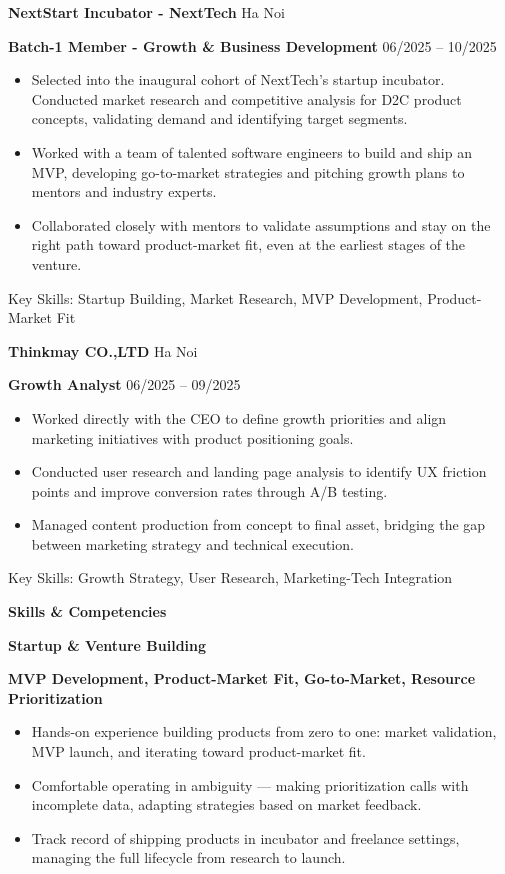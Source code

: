 \documentclass[11pt]{article}
\begin{document}
\vspace{12pt}

\textbf{NextStart Incubator - NextTech} \hfill Ha Noi

\textbf{Batch-1 Member - Growth \& Business Development} \hfill 06/2025 -- 10/2025
\begin{itemize}[noitemsep, topsep=0pt, partopsep=0pt, parsep=0pt]
    \item Selected into the inaugural cohort of NextTech's startup incubator. Conducted market research and competitive analysis for D2C product concepts, validating demand and identifying target segments.
    \item Worked with a team of talented software engineers to build and ship an MVP, developing go-to-market strategies and pitching growth plans to mentors and industry experts.
    \item Collaborated closely with mentors to validate assumptions and stay on the right path toward product-market fit, even at the earliest stages of the venture.
\end{itemize}
Key Skills: Startup Building, Market Research, MVP Development, Product-Market Fit

\vspace{12pt}

\textbf{Thinkmay CO.,LTD} \hfill Ha Noi

\textbf{Growth Analyst} \hfill 06/2025 -- 09/2025
\begin{itemize}[noitemsep, topsep=0pt, partopsep=0pt, parsep=0pt]
    \item Worked directly with the CEO to define growth priorities and align marketing initiatives with product positioning goals.
    \item Conducted user research and landing page analysis to identify UX friction points and improve conversion rates through A/B testing.
    \item Managed content production from concept to final asset, bridging the gap between marketing strategy and technical execution.
\end{itemize}
Key Skills: Growth Strategy, User Research, Marketing-Tech Integration

\newpage
\begin{center}
    \textbf{Skills \& Competencies}
\end{center}

\textbf{Startup \& Venture Building}

\textbf{MVP Development, Product-Market Fit, Go-to-Market, Resource Prioritization}
\begin{itemize}[noitemsep, topsep=0pt]
    \item Hands-on experience building products from zero to one: market validation, MVP launch, and iterating toward product-market fit.
    \item Comfortable operating in ambiguity --- making prioritization calls with incomplete data, adapting strategies based on market feedback.
    \item Track record of shipping products in incubator and freelance settings, managing the full lifecycle from research to launch.
\end{itemize}
\end{document}
